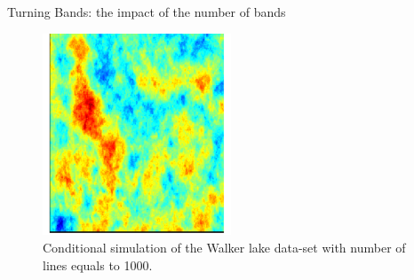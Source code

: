 \begin{frame}{Turning Bands: the impact of the number of bands}
\begin{figure}
\begin{center}
\includegraphics[width=0.5\textwidth]{figs/walker_lake_tb_n_1000.pdf}
\end{center}
\caption{Conditional simulation of the Walker lake data-set with number of lines equals to 1000.}
\label{fig:gaussian_unc_simulation}
\end{figure}
\end{frame}

